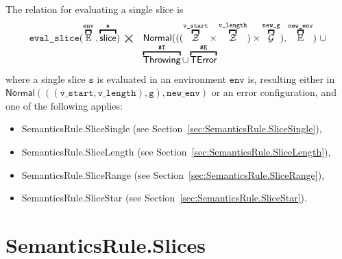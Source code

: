 \documentclass{book}
\newcommand\secref[1]{Section~\ref{sec:#1}}
\newcommand\overname[2]{\overbracket{#1}^{#2}}
\newcommand\XGraphs[0]{\mathcal{G}}
\newcommand\tint[0]{\mathcal{Z}}
\newcommand\aslrel[0]{\bigtimes}
\newcommand\aslsep[0]{\mathbf{,}}
\newcommand\ThrowingConfig[0]{\texttt{\#T}}
\newcommand\ErrorConfig[0]{\texttt{\#E}}
\newcommand\TError[0]{\textsf{TError}}
\newcommand\evalslice[1]{\texttt{eval\_slice}(#1)}
\newcommand\Normal[0]{\textsf{Normal}}
\newcommand\Throwing[0]{\textsf{Throwing}}
\newcommand\newenv[0]{\texttt{new\_env}}
\newcommand\env[0]{\texttt{env}}
\newcommand\vg[0]{\texttt{g}}
\newcommand\newg[0]{\texttt{new\_g}}
\newcommand\vs[0]{\texttt{s}}
\newcommand\vstart[0]{\texttt{v\_start}}
\newcommand\vlength[0]{\texttt{v\_length}}
\begin{document}
The relation for evaluating a single slice is
\[
  \begin{array}{rl}
  \evalslice{\overname{\envs}{\env} \aslsep \overname{\slice}{\vs}} \;\aslrel &
    \Normal(((\overname{\tint}{\vstart} \times \overname{\tint}{\vlength}) \times \overname{\XGraphs}{\newg}), \overname{\envs}{\newenv})\ \cup \\
    & \overname{\Throwing}{\ThrowingConfig} \cup \overname{\TError}{\ErrorConfig}
  \end{array}
\]
where a single slice $\vs$ is evaluated in an environment $\env$ is,
resulting either in $\Normal(((\vstart, \vlength), \vg), \newenv)$
or an error configuration,
and one of the following applies:
\begin{itemize}
  \item SemanticsRule.SliceSingle (see \secref{SemanticsRule.SliceSingle}),
  \item SemanticsRule.SliceLength (see \secref{SemanticsRule.SliceLength}),
  \item SemanticsRule.SliceRange (see \secref{SemanticsRule.SliceRange}),
  \item SemanticsRule.SliceStar (see \secref{SemanticsRule.SliceStar}).
  \end{itemize}

\section{SemanticsRule.Slices \label{sec:SemanticsRule.Slices}}
\end{document}
